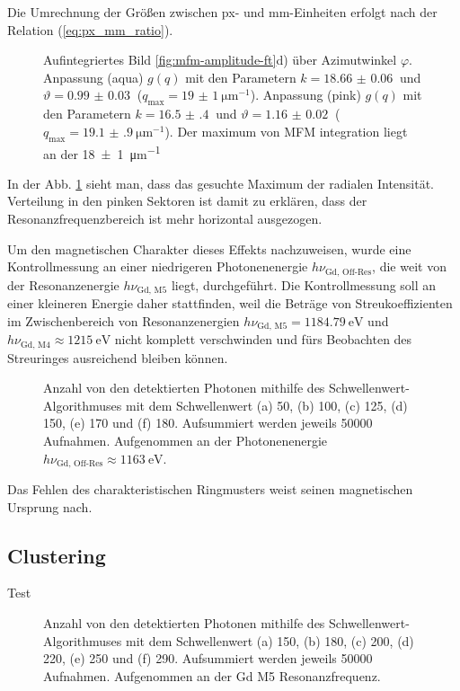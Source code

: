 Die Umrechnung der Größen zwischen px- und \si{\milli\meter}-Einheiten erfolgt nach der Relation (\ref{eq:px_mm_ratio}). 



\begin{figure}[H]
    \centering
    
    \caption{Aufintegriertes Bild \ref{fig:mfm-amplitude-ft}d) über Azimutwinkel $\varphi$. Anpassung (aqua) $g(q)$ mit den Parametern $k = \SI{18.66(6)}{}$ und $\vartheta = \SI{0.99(3)}{}$ ($q_\text{max} = \SI{19(1)}{\micro\meter^{-1}}$). Anpassung (pink) $g(q)$ mit den Parametern $k = \SI{16.5(4)}{}$ und $\vartheta = \SI{1.16(2)}{}$ ($q_\text{max} = \SI{19.1(9)}{\micro\meter^{-1}}$). Der maximum von MFM integration liegt an der \SI{18(1)}{\micro\meter^{-1}}}
    \label{fig:radius_fit}
\end{figure}
\noindent
In der Abb. \ref{fig:radius_fit} sieht man, dass das gesuchte Maximum der radialen Intensität. Verteilung in den pinken Sektoren ist damit zu erklären, dass der Resonanzfrequenzbereich ist  mehr horizontal ausgezogen.

\noindent
Um den magnetischen Charakter dieses Effekts nachzuweisen, wurde eine Kontrollmessung an einer niedrigeren Photonenenergie $h\nu_{\text{Gd, Off-Res}}$, die weit von der Resonanzenergie $h\nu_{\text{Gd, M5}}$ liegt, durchgeführt. Die Kontrollmessung soll an einer kleineren Energie daher stattfinden, weil die Beträge von Streukoeffizienten im Zwischenbereich von Resonanzenergien $h\nu_{\text{Gd, M5}} = \SI{1184,79}{\eV}$ und $h\nu_{\text{Gd, M4}} \approx \SI{1215}{\eV}$ nicht komplett verschwinden und fürs Beobachten des Streuringes ausreichend bleiben können.





\begin{figure}[H]
    \centering
    
    \caption{Anzahl von den detektierten Photonen mithilfe des Schwellenwert-Algorithmuses mit dem Schwellenwert (a) \SI{50}{\adu}, (b) \SI{100}{\adu}, (c) \SI{125}{\adu}, (d) \SI{150}{\adu}, (e) \SI{170}{\adu} und (f) \SI{180}{\adu}. Aufsummiert werden jeweils \num{50000} Aufnahmen. Aufgenommen an der Photonenenergie $h\nu_\text{Gd, Off-Res} \approx \SI{1163}{\eV}$.}
    \label{fig:th_50_100_125_150_170_180_off_resonance}
\end{figure}
Das Fehlen des charakteristischen Ringmusters weist seinen magnetischen Ursprung nach. 
\subsection{Clustering}
\noindent
Test
\begin{figure}[H]
    \centering
    
    \caption{Anzahl von den detektierten Photonen mithilfe des Schwellenwert-Algorithmuses mit dem Schwellenwert (a) \SI{150}{\adu}, (b) \SI{180}{\adu}, (c) \SI{200}{\adu}, (d) \SI{220}{\adu}, (e) \SI{250}{\adu} und (f) \SI{290}{\adu}. Aufsummiert werden jeweils \num{50000} Aufnahmen. Aufgenommen an der Gd M5 Resonanzfrequenz.}
    \label{fig:cl_2_0_100_125_150_170_180_resonance}
\end{figure}

